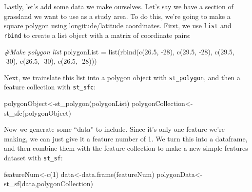 \documentclass[
]{book}
\newenvironment{Shaded}{\begin{snugshade}}{\end{snugshade}}
\newcommand{\CommentTok}[1]{\textcolor[rgb]{0.56,0.35,0.01}{\textit{#1}}}
\newcommand{\DecValTok}[1]{\textcolor[rgb]{0.00,0.00,0.81}{#1}}
\newcommand{\FloatTok}[1]{\textcolor[rgb]{0.00,0.00,0.81}{#1}}
\newcommand{\FunctionTok}[1]{\textcolor[rgb]{0.00,0.00,0.00}{#1}}
\newcommand{\NormalTok}[1]{#1}
\newcommand{\OtherTok}[1]{\textcolor[rgb]{0.56,0.35,0.01}{#1}}
\newcommand{\SpecialCharTok}[1]{\textcolor[rgb]{0.00,0.00,0.00}{#1}}
\begin{document}
Lastly, let's add some data we make ourselves. Let's say we have a section of grassland we want to use as a study area. To do this, we're going to make a square polygon using longitude/latitude coordinates. First, we use \texttt{list} and \texttt{rbind} to create a list object with a matrix of coordinate pairs:

\begin{Shaded}
\begin{Highlighting}[]
\CommentTok{\#Make polygon list}
\NormalTok{polygonList }\OtherTok{=} \FunctionTok{list}\NormalTok{(}\FunctionTok{rbind}\NormalTok{(}\FunctionTok{c}\NormalTok{(}\FloatTok{26.5}\NormalTok{, }\SpecialCharTok{{-}}\DecValTok{28}\NormalTok{), }\FunctionTok{c}\NormalTok{(}\FloatTok{29.5}\NormalTok{, }\SpecialCharTok{{-}}\DecValTok{28}\NormalTok{), }\FunctionTok{c}\NormalTok{(}\FloatTok{29.5}\NormalTok{, }\SpecialCharTok{{-}}\DecValTok{30}\NormalTok{), }\FunctionTok{c}\NormalTok{(}\FloatTok{26.5}\NormalTok{, }\SpecialCharTok{{-}}\DecValTok{30}\NormalTok{), }\FunctionTok{c}\NormalTok{(}\FloatTok{26.5}\NormalTok{, }\SpecialCharTok{{-}}\DecValTok{28}\NormalTok{)))}
\end{Highlighting}
\end{Shaded}

Next, we trainslate this list into a polygon object with \texttt{st\_polygon}, and then a feature collection with \texttt{st\_sfc}:

\begin{Shaded}
\begin{Highlighting}[]
\NormalTok{polygonObject}\OtherTok{\textless{}{-}}\FunctionTok{st\_polygon}\NormalTok{(polygonList)}
\NormalTok{polygonCollection}\OtherTok{\textless{}{-}}\FunctionTok{st\_sfc}\NormalTok{(polygonObject)}
\end{Highlighting}
\end{Shaded}

Now we generate some ``data'' to include. Since it's only one feature we're making, we can just give it a feature number of 1. We turn this into a dataframe, and then combine them with the feature collection to make a new simple features dataset with \texttt{st\_sf}:

\begin{Shaded}
\begin{Highlighting}[]
\NormalTok{featureNum}\OtherTok{\textless{}{-}}\FunctionTok{c}\NormalTok{(}\DecValTok{1}\NormalTok{)}
\NormalTok{data}\OtherTok{\textless{}{-}}\FunctionTok{data.frame}\NormalTok{(featureNum)}
\NormalTok{polygonData}\OtherTok{\textless{}{-}}\FunctionTok{st\_sf}\NormalTok{(data,polygonCollection)}
\end{Highlighting}
\end{Shaded}
\end{document}
